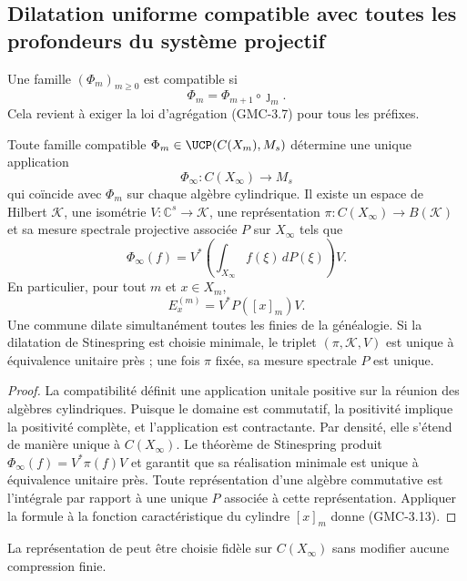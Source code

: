 \subsection{Dilatation uniforme compatible avec toutes les profondeurs du système projectif}

Une famille $(\Phi_m)_{m\ge0}$ est compatible si
\[
 \Phi_m=\Phi_{m+1}\circ\jmath_m.
 \tag{GMC-3.10}
\]
Cela revient à exiger la loi d'agrégation \textup{(GMC-3.7)} pour tous les préfixes.

\begin{theorem}
\label{p12-83-c22-s4:gmc:thm:dilatacion-diagonal}
Toute famille compatible
$\Phi_m\in\UCP(C(X_m),M_s)$ détermine une unique application
\[
 \Phi_\infty:C(X_\infty)\longrightarrow M_s
 \tag{GMC-3.11}
\]
qui coïncide avec $\Phi_m$ sur chaque algèbre cylindrique. Il existe un espace de
Hilbert $\mathcal K$, une isométrie $V:\mathbb C^s\to\mathcal K$, une
représentation $\pi:C(X_\infty)\to B(\mathcal K)$ et sa mesure spectrale
projective associée $P$ sur $X_\infty$ tels que
\[
 \Phi_\infty(f)=V^*\left(\int_{X_\infty}f(\xi)\,dP(\xi)\right)V.
 \tag{GMC-3.12}
\]
En particulier, pour tout $m$ et $x\in X_m$,
\[
 E_x^{(m)}=V^*P([x]_m)V.
 \tag{GMC-3.13}
\]
Une \PVM commune dilate simultanément toutes les \POVM finies de la
généalogie. Si la dilatation de Stinespring est choisie minimale, le triplet
$(\pi,\mathcal K,V)$ est unique à équivalence unitaire près ; une fois
$\pi$ fixée, sa mesure spectrale $P$ est unique.
\end{theorem}

\begin{proof}
La compatibilité définit une application unitale positive sur la réunion des
algèbres cylindriques. Puisque le domaine est commutatif, la positivité implique la
positivité complète, et l'application est contractante. Par densité, elle
s'étend de manière unique à $C(X_\infty)$. Le théorème de Stinespring produit
$\Phi_\infty(f)=V^*\pi(f)V$ et garantit que sa réalisation minimale est unique
à équivalence unitaire près. Toute représentation d'une algèbre commutative
est l'intégrale par rapport à une unique \PVM $P$ associée à cette représentation.
Appliquer la formule à la fonction
caractéristique du cylindre $[x]_m$ donne \textup{(GMC-3.13)}.
\end{proof}

\begin{corollary}
La représentation de  peut être choisie fidèle sur
$C(X_\infty)$ sans modifier aucune compression finie.
\end{corollary}

